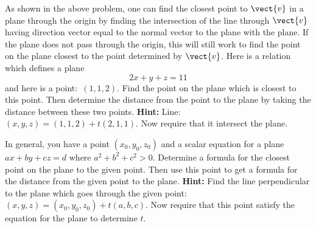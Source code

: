 \begin{enumialphparenastyle}
\begin{ex} As shown in the above problem, one can find the closest point to $\vect{v}$ in a plane through the origin by finding the intersection of the line
through $\vect{v}$ having direction vector equal to the normal vector to the
plane with the plane. If the plane does not pass through the origin, this
will still work to find the point on the plane closest to the point
determined by $\vect{v}$. Here is a relation which defines a plane 
\begin{equation*}
2x+y+z=11
\end{equation*}
and here is a point:\ $\left( 1,1,2\right) $. Find the point on the plane
which is closest to this point. Then determine the distance from the point
to the plane by taking the distance between these two points. \textbf{Hint: }
Line: $\left( x,y,z\right) =\left( 1,1,2\right) +t\left( 2,1,1\right) .$ Now
require that it intersect the plane. $\ $
\end{ex}

\begin{ex} In general, you have a point $\left( x_{0},y_{0},z_{0}\right) $ and a
scalar equation for a plane $ax+by+cz=d$ where $a^{2}+b^{2}+c^{2}>0$.
Determine a formula for the closest point on the plane to the given point.
Then use this point to get a formula for the distance from the given point
to the plane. \textbf{Hint: }Find the line perpendicular to the plane which
goes through the given point: $\left( x,y,z\right) =\left(
x_{0},y_{0},z_{0}\right) +t\left( a,b,c\right) .$ Now require that this
point satisfy the equation for the plane to determine $t$.
\end{ex}

\end{enumialphparenastyle}